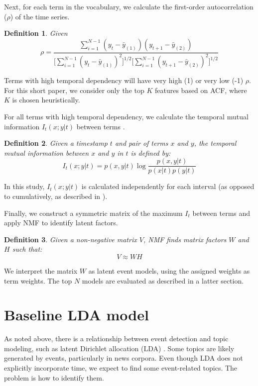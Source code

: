 \documentclass{sig-alternate}
\newtheorem{definition}{Definition}
\begin{document}
Next, for each term in the vocabulary, we calculate the first-order autocorrelation ($\rho$) of the time series. 
\begin{definition}
 Given 
\[
\rho = \dfrac{\sum_{i=1}^{N-1} (y_t - \bar{y}_{(1)})(y_{t+1} - \bar{y}_{(2)})}{ \big [ \sum_{i=1}^{N-1}  (y_t - \bar{y}_{(1)})^2 \big ] ^{1/2} \big [\sum_{i=1}^{N-1} (y_{t+1} - \bar{y}_{(2)})^2 \big ]^{1/2}}
\]
\end{definition}

Terms with high temporal dependency will have very high (1) or very low (-1) $\rho$.  For this short paper, we consider only the top $K$ features based on ACF, where $K$ is chosen heuristically.

For all terms with high temporal dependency, we calculate the temporal mutual information $I_t(x;y \vert t)$ between terms \cite{Teng2008}. 

\begin{definition}
Given a timestamp $t$ and pair of terms $x$ and $y$, the temporal mutual information between $x$ and $y$ in $t$ is defined by:
\[
I_t(x;y \vert t) = p(x,y \vert t) \log \dfrac{p(x,y \vert t)}{p(x \vert t) p(y \vert t)}
\]
\end{definition}

In this study, $I_t(x;y \vert t)$ is calculated independently for each interval (as opposed to cumulatively, as described in \cite{Teng2008}).

Finally, we construct a symmetric matrix of the maximum $I_t$ between terms and apply NMF \cite{Lee2001} to identify latent factors. 
\begin{definition}
 Given a non-negative matrix $V$, NMF finds matrix factors $W$ and $H$ such that:
\[
V \approx WH
\]
\end{definition}

We interpret the matrix $W$ as latent event models, using the assigned weights as term weights. The top $N$ models are evaluated as described in a latter section. 

\section{Baseline LDA model}

As noted above, there is a relationship between event detection and topic modeling, such as latent Dirichlet allocation (LDA) \cite{Blei2003}. Some topics are likely generated by events, particularly in news corpora. Even though LDA does not explicitly incorporate time, we expect to find some event-related topics.  The problem is how to identify them.
\end{document}
